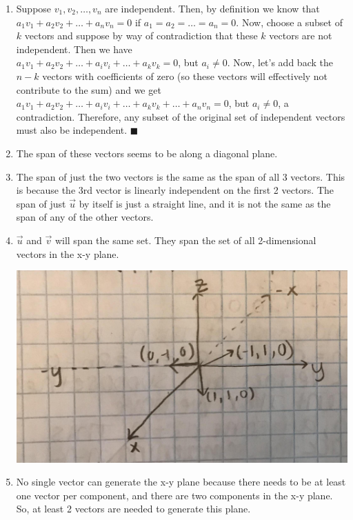 \documentclass{article}
\newcommand*{\qed}{\hfill\ensuremath{\blacksquare}}
\begin{document}
\begin{enumerate}
\item Suppose $v_1, v_2, \dots, v_n$ are independent. Then, by definition we know that\\
$a_1v_1 + a_2v_2 + \dots + a_nv_n = 0$ if $a_1 = a_2 = \dots = a_n = 0$. Now, choose a subset of $k$ vectors and suppose by way of contradiction that these $k$ vectors are not independent. Then we have\\
$a_1v_1 + a_2v_2 + \dots + a_iv_i + \dots + a_kv_k = 0$, but $a_i \neq 0$. Now, let's add back the $n-k$ vectors with coefficients of zero (so these vectors will effectively not contribute to the sum) and we get\\
$a_1v_1 + a_2v_2 + \dots + a_iv_i + \dots + a_kv_k + \dots + a_nv_n = 0$, but $a_i \neq 0$, a contradiction. Therefore, any subset of the original set of independent vectors must also be independent. \qed

\item The span of these vectors seems to be along a diagonal plane. 

\item The span of just the two vectors is the same as the span of all 3 vectors. This is because the 3rd vector is linearly independent on the first 2 vectors. The span of just $\overrightarrow{u}$ by itself is just a straight line, and it is not the same as the span of any of the other vectors. 

\item $\overrightarrow{u}$ and $\overrightarrow{v}$ will span the same set. They span the set of all 2-dimensional vectors in the x-y plane. 

\includegraphics[scale=0.1]{exercise11.jpg}


\item No single vector can generate the x-y plane because there needs to be at least one vector per component, and there are two components in the x-y plane. So, at least 2 vectors are needed to generate this plane. 


\end{enumerate}
\end{document}
